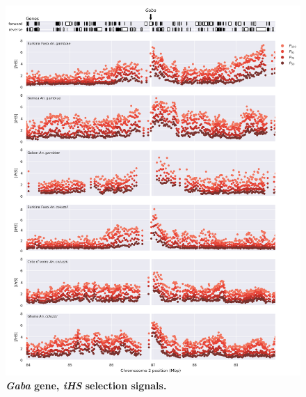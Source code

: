\documentclass[a4paper,11pt,abstracton,hidelinks]{scrartcl}
\begin{document}
\begin{figure}[t!]
	\begin{center}
		\includegraphics*[width=1.1\linewidth,center]{artwork/locus_gaba_ihs.png}
	\end{center}
	\caption[\textit{Gaba} gene, \textit{iHS} selection signals]{
	\textbf{\textit{Gaba} gene, \textit{iHS} selection signals.}
	} 
	\label{fig:locus_gaba_ihs}
\end{figure}


\clearpage
\end{document}
